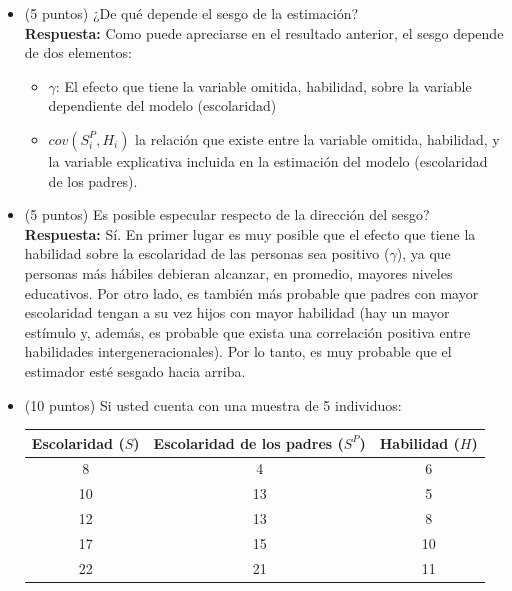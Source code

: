 \documentclass[10pt,a4paper]{article}
\begin{document}
\begin{enumerate}
\begin{itemize}
            \item [b)] (5 puntos) ¿De qué depende el sesgo de la estimación?\\

            \textbf{Respuesta:} Como puede apreciarse en el resultado anterior, el sesgo depende de dos elementos:
            \begin{itemize}
                \item $\gamma$: El efecto que tiene la variable omitida, habilidad, sobre la variable dependiente del modelo (escolaridad)
                \item $cov(S^P_i, H_i)$ la relación que existe entre la variable omitida, habilidad, y la variable explicativa incluida en la estimación del modelo (escolaridad de los padres).
            \end{itemize}
 
            \item [c)] (5 puntos) Es posible especular respecto de la dirección del sesgo?\\

            \textbf{Respuesta:} Sí. En primer lugar es muy posible que el efecto que tiene la habilidad sobre la escolaridad de las personas sea positivo ($\gamma$), ya que personas más hábiles debieran alcanzar, en promedio, mayores niveles educativos. Por otro lado, es también más probable que padres con mayor escolaridad tengan a su vez hijos con mayor habilidad (hay un mayor estímulo y, además, es probable que exista una correlación positiva entre habilidades intergeneracionales). Por lo tanto, es muy probable que el estimador esté sesgado hacia arriba.

            \item [d)] (10 puntos) Si usted cuenta con una muestra de 5 individuos:

            \begin{table}[H]
                \centering
                \begin{tabular}{c|c|c}
                 Escolaridad ($S$) & Escolaridad de los padres ($S^P$)& Habilidad ($H$) \\ \hline
                 8&4&6\\  
                 10&13&5\\ 
                 12&13&8\\ 
                 17&15&10\\ 
                 22&21&11\\ 
                \end{tabular}
                \label{tab:placeholder}
            \end{table}


\end{itemize}
\end{enumerate}
\end{document}
